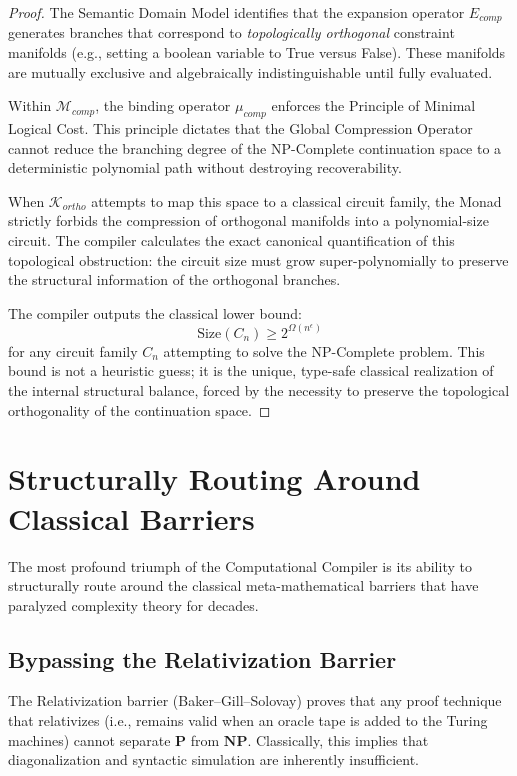 \documentclass[12pt,openany]{extbook}
\theoremstyle{plain}
\theoremstyle{definition}
\begin{document}
\begin{proof}
The Semantic Domain Model identifies that the expansion operator $E_{comp}$ generates branches that correspond to \emph{topologically orthogonal} constraint manifolds (e.g., setting a boolean variable to True versus False). These manifolds are mutually exclusive and algebraically indistinguishable until fully evaluated.

Within $\mathcal{M}_{comp}$, the binding operator $\mu_{comp}$ enforces the Principle of Minimal Logical Cost. This principle dictates that the Global Compression Operator cannot reduce the branching degree of the NP-Complete continuation space to a deterministic polynomial path without destroying recoverability. 

When $\mathcal{K}_{ortho}$ attempts to map this space to a classical circuit family, the Monad strictly forbids the compression of orthogonal manifolds into a polynomial-size circuit. The compiler calculates the exact canonical quantification of this topological obstruction: the circuit size must grow super-polynomially to preserve the structural information of the orthogonal branches. 

The compiler outputs the classical lower bound:
\[
\text{Size}(C_n) \geq 2^{\Omega(n^\epsilon)}
\]
for any circuit family $C_n$ attempting to solve the NP-Complete problem. This bound is not a heuristic guess; it is the unique, type-safe classical realization of the internal structural balance, forced by the necessity to preserve the topological orthogonality of the continuation space.
\end{proof}

\section{Structurally Routing Around Classical Barriers}

The most profound triumph of the Computational Compiler is its ability to structurally route around the classical meta-mathematical barriers that have paralyzed complexity theory for decades.

\subsection{Bypassing the Relativization Barrier}
The Relativization barrier (Baker--Gill--Solovay) proves that any proof technique that relativizes (i.e., remains valid when an oracle tape is added to the Turing machines) cannot separate $\mathbf{P}$ from $\mathbf{NP}$. Classically, this implies that diagonalization and syntactic simulation are inherently insufficient.
\end{document}
